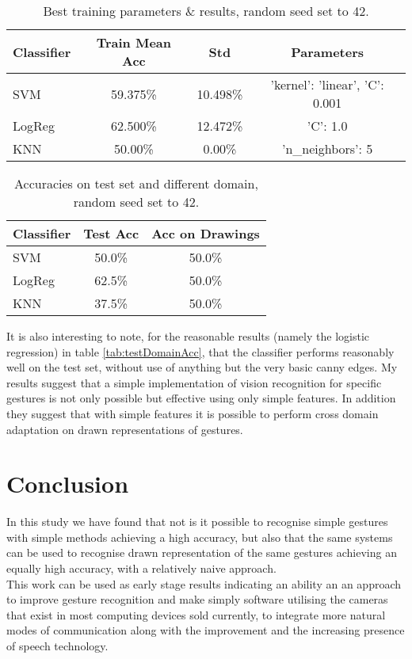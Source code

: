 \documentclass[11pt, a4paper]{article}
\begin{document}
\begin{table}[h]
  \centering
  \small
  \setlength\tabcolsep{2pt}
    \begin{tabular}{l|ccc}
    Classifier & Train Mean Acc & Std      & Parameters                     \\\hline
    SVM        & 59.375\%       & 10.498\% & 'kernel': 'linear', 'C': 0.001 \\
    LogReg     & 62.500\%       & 12.472\% & 'C': 1.0                       \\
    KNN        & 50.00\%        & 0.00\%   & 'n\_neighbors': 5
    \end{tabular}
    \caption{Best training parameters \& results, random seed set to 42.}
  \label{tab:randomSeed}
\end{table}

\begin{table}[h]
  \centering
    \begin{tabular}{l|cc}
    Classifier & Test Acc & Acc on Drawings \\\hline
    SVM        & 50.0\%   & 50.0\%          \\
    LogReg     & 62.5\%   & 50.0\%          \\
    KNN        & 37.5\%   & 50.0\%
    \end{tabular}
  \caption{Accuracies on test set and different domain, random seed set to 42.}
  \label{tab:seedDomainAcc}
\end{table}
It is also interesting to note, for the reasonable results (namely the logistic regression) in table \ref{tab:testDomainAcc}, that the classifier performs reasonably well on the test set, without use of anything but the very basic canny edges. My results suggest that a simple implementation of vision recognition for specific gestures is not only possible but effective using only simple features. In addition they suggest that with simple features it is possible to perform cross domain adaptation on drawn representations of gestures. 
\section{Conclusion}
In this study we have found that not is it possible to recognise simple gestures with simple methods achieving a high accuracy, but also that the same systems can be used to recognise drawn representation of the same gestures achieving an equally high accuracy, with a relatively naive approach.\\
This work can be used as early stage results indicating an ability an an approach to improve gesture recognition and make simply software utilising the cameras that exist in most computing devices sold currently, to integrate more natural modes of communication along with the improvement and the increasing presence of speech technology.
\end{document}
